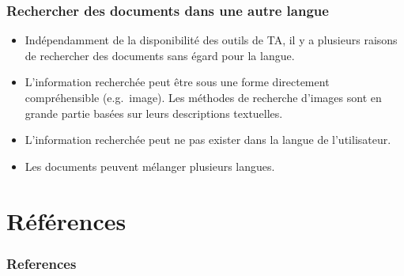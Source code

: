 \documentclass[12pt,aspectratio=43,dvipsnames,table]{beamer}
\begin{document}
\begin{frame}[allowframebreaks]
    \frametitle{Rechercher des documents dans une autre langue}
    \begin{itemize} \itemsep10pt
        \item Indépendamment de la disponibilité des outils de TA, il y a 
              plusieurs raisons de rechercher des documents sans égard pour 
              la langue.
        \item L'information recherchée peut être sous une forme directement 
              compréhensible (e.g.~image). Les méthodes de recherche d'images 
              sont en grande partie basées sur leurs descriptions textuelles.
        \item L'information recherchée peut ne pas exister dans la langue de 
              l'utilisateur.
        \item Les documents peuvent mélanger plusieurs langues.
    \end{itemize}
\end{frame}


\begin{frame}
    \frametitle{}
\end{frame}

\appendix


\section{Références}


\begin{frame}[allowframebreaks]
    \frametitle{References}
    
    
\end{frame}
\end{document}
